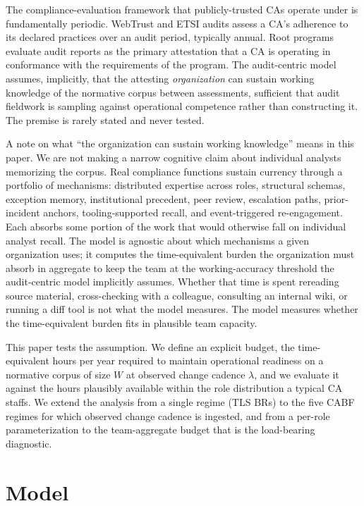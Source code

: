 \documentclass[11pt,letterpaper]{article}
\begin{document}
The compliance-evaluation framework that publicly-trusted CAs operate under is fundamentally periodic. WebTrust and ETSI audits assess a CA's adherence to its declared practices over an audit period, typically annual. Root programs evaluate audit reports as the primary attestation that a CA is operating in conformance with the requirements of the program. The audit-centric model assumes, implicitly, that the attesting \textit{organization} can sustain working knowledge of the normative corpus between assessments, sufficient that audit fieldwork is sampling against operational competence rather than constructing it. The premise is rarely stated and never tested.

A note on what ``the organization can sustain working knowledge'' means in this paper. We are not making a narrow cognitive claim about individual analysts memorizing the corpus. Real compliance functions sustain currency through a portfolio of mechanisms: distributed expertise across roles, structural schemas, exception memory, institutional precedent, peer review, escalation paths, prior-incident anchors, tooling-supported recall, and event-triggered re-engagement. Each absorbs some portion of the work that would otherwise fall on individual analyst recall. The model is agnostic about which mechanisms a given organization uses; it computes the time-equivalent burden the organization must absorb in aggregate to keep the team at the working-accuracy threshold the audit-centric model implicitly assumes. Whether that time is spent rereading source material, cross-checking with a colleague, consulting an internal wiki, or running a diff tool is not what the model measures. The model measures whether the time-equivalent burden fits in plausible team capacity.

This paper tests the assumption. We define an explicit budget, the time-equivalent hours per year required to maintain operational readiness on a normative corpus of size $W$ at observed change cadence $\lambda$, and we evaluate it against the hours plausibly available within the role distribution a typical CA staffs. We extend the analysis from a single regime (TLS BRs) to the five CABF regimes for which observed change cadence is ingested, and from a per-role parameterization to the team-aggregate budget that is the load-bearing diagnostic.

\section{Model}
\label{sec:model}
\end{document}
